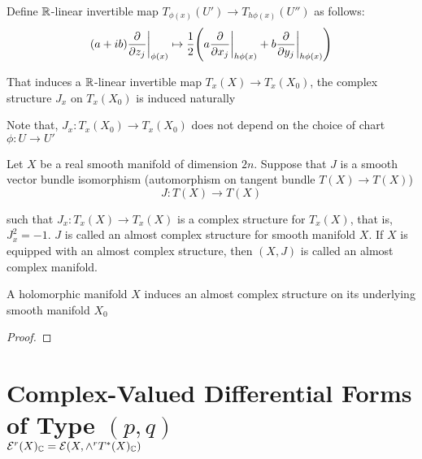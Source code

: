\begin{proposition}
\begin{longproof}
		Define $\mathbb{R}$-linear invertible map $T_{\phi(x)}(U') \to T_{h \phi(x)}(U'')$ as follows:
		$$
		(a + ib) \frac{\partial}{\partial z_j}\bigg\vert_{\phi(x)} \mapsto \frac{1}{2} \tuple*{ a \frac{\partial}{\partial x_j}\bigg\vert_{h \phi(x)} + b \frac{\partial}{\partial y_j}\bigg\vert_{h \phi(x)}}
		$$
		
		That induces a $\mathbb{R}$-linear invertible map $T_x(X) \to T_x(X_0)$, the complex structure $J_x$ on $T_x(X_0)$ is induced naturally
		\begin{center}
		\end{center}
		
		Note that, $J_x: T_x(X_0) \to T_x(X_0)$ does not depend on the choice of chart $\phi: U \to U'$
		
	\end{longproof}
\end{proposition}

\begin{definition}
	Let $X$ be a real smooth manifold of dimension $2n$. Suppose that $J$ is a smooth vector bundle isomorphism (automorphism on tangent bundle $T(X) \to T(X)$)
	$$
	J: T(X) \to T(X)
	$$
	
	such that $J_x: T_x(X) \to T_x(X)$ is a complex structure for $T_x(X)$, that is, $J_x^2 = -1$. $J$ is called an almost complex structure for smooth manifold $X$. If $X$ is equipped with an almost complex structure, then $(X, J)$ is called an almost complex manifold.
\end{definition}

\begin{proposition}
	A holomorphic manifold $X$ induces an almost complex structure on its underlying smooth manifold $X_0$
	\begin{proof}
	\end{proof}
\end{proposition}

\section{Complex-Valued Differential Forms of Type $(p, q)$ \\ $\mathcal{E}^r(X)_{\mathbb{C}} = \mathcal{E}(X, \wedge^r T^*(X)_{\mathbb{C}})$}

